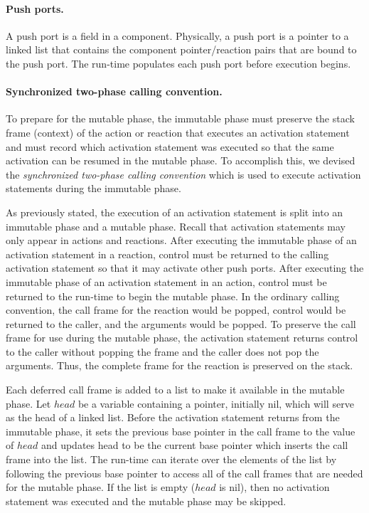 \paragraph{Push ports.}
A push port is a field in a component.
Physically, a push port is a pointer to a linked list that contains the component pointer/reaction pairs that are bound to the push port.
The run-time populates each push port before execution begins.

\paragraph{Synchronized two-phase calling convention.}
To prepare for the mutable phase, the immutable phase must preserve the stack frame (context) of the action or reaction that executes an activation statement and must record which activation statement was executed so that the same activation can be resumed in the mutable phase.
To accomplish this, we devised the \emph{synchronized two-phase calling convention} which is used to execute activation statements during the immutable phase.

As previously stated, the execution of an activation statement is split into an immutable phase and a mutable phase.
Recall that activation statements may only appear in actions and reactions.
After executing the immutable phase of an activation statement in a reaction, control must be returned to the calling activation statement so that it may activate other push ports.
After executing the immutable phase of an activation statement in an action, control must be returned to the run-time to begin the mutable phase.
In the ordinary calling convention, the call frame for the reaction would be popped, control would be returned to the caller, and the arguments would be popped.
To preserve the call frame for use during the mutable phase, the activation statement returns control to the caller without popping the frame and the caller does not pop the arguments.
Thus, the complete frame for the reaction is preserved on the stack.

Each deferred call frame is added to a list to make it available in the mutable phase.
Let $head$ be a variable containing a pointer, initially nil, which will serve as the head of a linked list.
Before the activation statement returns from the immutable phase, it sets the previous base pointer in the call frame to the value of $head$ and updates head to be the current base pointer which inserts the call frame into the list.
The run-time can iterate over the elements of the list by following the previous base pointer to access all of the call frames that are needed for the mutable phase.
If the list is empty ($head$ is nil), then no activation statement was executed and the mutable phase may be skipped.

